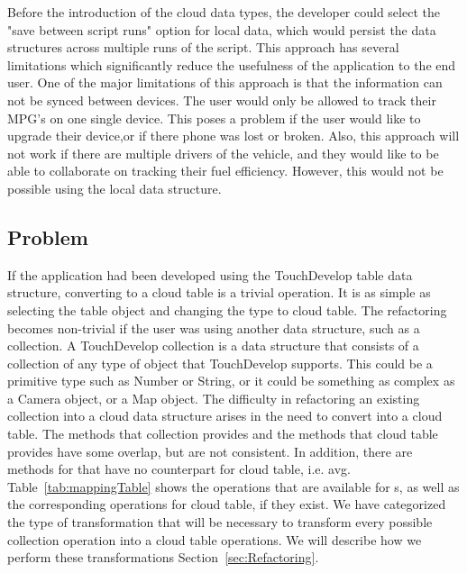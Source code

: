 \documentclass{sigplanconf}
\begin{document}
Before the introduction of the cloud data types, the developer could select the "save between script runs" option for local data, which would persist the data structures across multiple runs of the script.  This approach has several limitations which significantly reduce the usefulness of the application to the end user.  One of the major limitations of this approach is that the information can not be synced between devices.  The user would only be allowed to track their MPG's on one single device.  This poses a problem if the user would like to upgrade their device,or if there phone was lost or broken.   Also, this approach will not work if there are multiple drivers of the vehicle, and they would like to be able to collaborate on tracking their fuel efficiency.  However, this would not be possible using the local data structure.


  
\subsection{Problem}
If the application had been developed using the TouchDevelop table data structure, converting to a cloud table is a trivial operation.  It is as simple as selecting the table object and changing the type to cloud table.  The refactoring becomes non-trivial if the user was using another data structure, such as a collection. A TouchDevelop collection is a data structure that consists of a collection of any type of object that TouchDevelop supports.  This could be a primitive type such as Number or String, or it could be something as complex as a Camera object, or a Map object.  The difficulty in refactoring an existing collection into a cloud data structure arises in the need to convert into a cloud table.  The methods that collection provides and the methods that cloud table provides have some overlap, but are not consistent.  In addition, there are methods for \NC{} that have no counterpart for cloud table, i.e. avg.  Table~\ref{tab:mappingTable} shows the operations that are available for \NC{}s, as well as the corresponding operations for cloud table, if they exist.  We have categorized the type of transformation that will be necessary to transform every possible collection operation into a cloud table operations.  We will describe how we perform these transformations Section~\ref{sec:Refactoring}.
\end{document}
